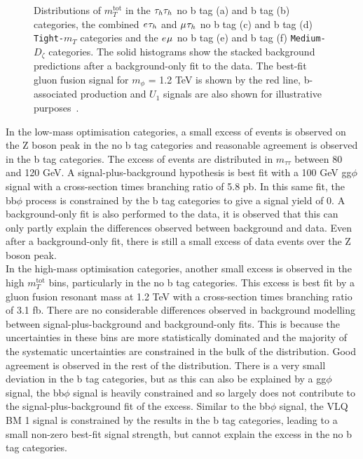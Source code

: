\begin{figure}[p!]
\caption[Plots of the $m_{T}^\text{tot}$ distributions in the high-mass optimisation categories.]{Distributions of $m_{T}^\text{tot}$ in the $\tau_{h}\tau_{h}$ no b tag (a) and b tag (b) categories, the combined $e_{}\tau_{h}$ and $\mu_{}\tau_{h}$ no b tag (c) and b tag (d) \texttt{Tight-$m_{T}$} categories and the $e_{}\mu_{}$ no b tag (e) and b tag (f) \texttt{Medium-$D_{\zeta}$} categories. The solid histograms show the stacked background predictions after a background-only fit to the data. The best-fit gluon fusion signal for $m_{\phi}$ = 1.2 TeV is shown by the red line, b-associated production and $U_{1}$ signals are also shown for illustrative purposes~\cite{CMS:2022rbd}.}
\label{fig:high_mass_postfit}
\end{figure}

In the low-mass optimisation categories, a small excess of events is observed on the Z boson peak in the no b tag categories and reasonable agreement is observed in the b tag categories.
The excess of events are distributed in $m_{\tau\tau}$ between 80 and 120 GeV.
A signal-plus-background hypothesis is best fit with a 100 GeV gg$\phi$ signal with a cross-section times branching ratio of 5.8 pb. 
In this same fit, the bb$\phi$ process is constrained by the b tag categories to give a signal yield of 0.
A background-only fit is also performed to the data, it is observed that this can only partly explain the differences observed between background and data.
Even after a background-only fit, there is still a small excess of data events over the Z boson peak. \\

In the high-mass optimisation categories, another small excess is observed in the high $m_{T}^{\text{tot}}$ bins, particularly in the no b tag categories.
This excess is best fit by a gluon fusion resonant mass at 1.2 TeV with a cross-section times branching ratio of 3.1 fb.
There are no considerable differences observed in background modelling between signal-plus-background and background-only fits.
This is because the uncertainties in these bins are more statistically dominated and the majority of the systematic uncertainties are constrained in the bulk of the distribution.
Good agreement is observed in the rest of the distribution.
There is a very small deviation in the b tag categories, but as this can also be explained by a gg$\phi$ signal, the bb$\phi$ signal is heavily constrained and so largely does not contribute to the signal-plus-background fit of the excess.
Similar to the bb$\phi$ signal, the VLQ BM 1 signal is constrained by the results in the b tag categories, leading to a small non-zero best-fit signal strength, but cannot explain the excess in the no b tag categories.

